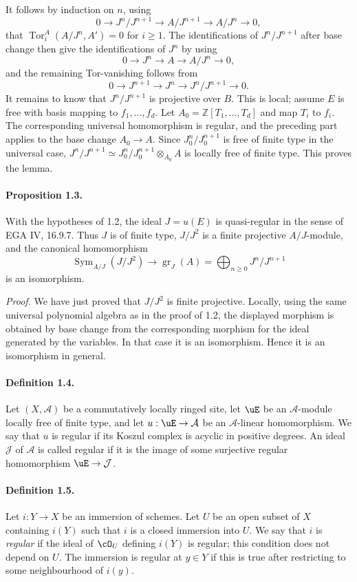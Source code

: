 \documentclass[11pt]{article}
\theoremstyle{plain}
\theoremstyle{definition}
\theoremstyle{remark}
\newcommand{\ZZ}{\mathbb Z}
\newcommand{\cA}{\mathcal A}\newcommand{\cB}{\mathcal B}\newcommand{\cC}{\mathcal C}
\newcommand{\cJ}{\mathcal J}\newcommand{\cK}{\mathcal K}\newcommand{\cL}{\mathcal L}
\DeclareMathOperator{\Tor}{Tor}
\DeclareMathOperator{\gr}{gr}
\providecommand{\Sym}{\operatorname{Sym}}
\begin{document}
It follows by induction on $n$, using
\[
0\to J^n/J^{n+1}\to A/J^{n+1}\to A/J^n\to0,
\]
that $\Tor_i^A(A/J^n,A')=0$ for $i\geq1$. The identifications of $J^n/J^{n+1}$ after base change then give the identifications of $J^n$ by using
\[
0\to J^n\to A\to A/J^n\to0,
\]
and the remaining Tor-vanishing follows from
\[
0\to J^{n+1}\to J^n\to J^n/J^{n+1}\to0.
\]
It remains to know that $J^n/J^{n+1}$ is projective over $B$. This is local; assume $E$ is free with basis mapping to $f_1,\ldots,f_d$. Let $A_0=\ZZ[T_1,\ldots,T_d]$ and map $T_i$ to $f_i$. The corresponding universal homomorphism is regular, and the preceding part applies to the base change $A_0\to A$. Since $J_0^n/J_0^{n+1}$ is free of finite type in the universal case, $J^n/J^{n+1}\simeq J_0^n/J_0^{n+1}\otimes_{A_0}A$ is locally free of finite type. This proves the lemma.

\paragraph{Proposition 1.3.} With the hypotheses of 1.2, the ideal $J=u(E)$ is quasi-regular in the sense of EGA IV, 16.9.7. Thus $J$ is of finite type, $J/J^2$ is a finite projective $A/J$-module, and the canonical homomorphism
\[
\Sym_{A/J}(J/J^2)\longrightarrow \gr_J(A)=\bigoplus_{n\geq0}J^n/J^{n+1}
\]
is an isomorphism.

\emph{Proof.} We have just proved that $J/J^2$ is finite projective. Locally, using the same universal polynomial algebra as in the proof of 1.2, the displayed morphism is obtained by base change from the corresponding morphism for the ideal generated by the variables. In that case it is an isomorphism. Hence it is an isomorphism in general.

\paragraph{Definition 1.4.} Let $(X,\cA)$ be a commutatively locally ringed site, let $\uE$ be an $\cA$-module locally free of finite type, and let $u:\uE\to\cA$ be an $\cA$-linear homomorphism. We say that $u$ is regular if its Koszul complex is acyclic in positive degrees. An ideal $\cJ$ of $\cA$ is called regular if it is the image of some surjective regular homomorphism $\uE\to\cJ$.

\paragraph{Definition 1.5.} Let $i:Y\to X$ be an immersion of schemes. Let $U$ be an open subset of $X$ containing $i(Y)$ such that $i$ is a closed immersion into $U$. We say that $i$ is \emph{regular} if the ideal of $\cO_U$ defining $i(Y)$ is regular; this condition does not depend on $U$. The immersion is regular at $y\in Y$ if this is true after restricting to some neighbourhood of $i(y)$.
\end{document}
